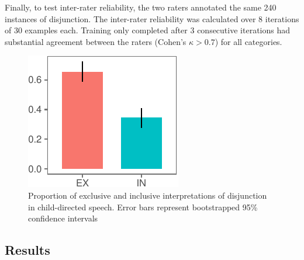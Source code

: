 \documentclass[10pt, letterpaper]{article}
\newenvironment{CodeChunk}{}{}
\begin{document}
Finally, to test inter-rater reliability, the two raters annotated the
same 240 instances of disjunction. The inter-rater reliability was
calculated over 8 iterations of 30 examples each. Training only
completed after 3 consecutive iterations had substantial agreement
between the raters (Cohen's \(\kappa > 0.7\)) for all categories.

\begin{CodeChunk}
\begin{figure}[b]

{\centering \includegraphics{figs/interpretation-1} 

}

\caption[Proportion of exclusive and inclusive interpretations of disjunction in child-directed speech]{Proportion of exclusive and inclusive interpretations of disjunction in child-directed speech. Error bars represent bootstrapped 95\% confidence intervals}\label{fig:interpretation}
\end{figure}
\end{CodeChunk}

\subsection{Results}\label{results-1}
\end{document}
